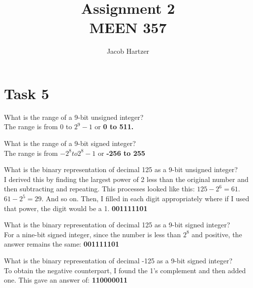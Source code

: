 \documentclass[12pt]{article}
\newenvironment{problem}[2][Problem]{\begin{trivlist}
\item[\hskip \labelsep {\bfseries #1}\hskip \labelsep {\bfseries #2.}]}{\end{trivlist}}
\begin{document}
 
 
\title{Assignment 2\\ MEEN 357}
\author{Jacob Hartzer}
\maketitle
 
\section*{Task 5}
\begin{problem}{i}
What is the range of a 9-bit unsigned integer?\\

The range is from 0 to $2^9-1$ or \bf{0 to 511}.
\end{problem}

\begin{problem}{ii}
What is the range of a 9-bit signed integer? \\

The range is from $-2^8 to 2^8-1$ or \bf{-256 to 255}
\end{problem}

\begin{problem}{iii}
What is the binary representation of decimal 125 as a 9-bit unsigned integer? \\

I derived this by finding the largest power of 2 less than the original number and then subtracting and repeating. This processes looked like this: $125 - 2^6 = 61$. $61 - 2^5 = 29$. And so on. Then, I filled in each digit appropriately where if I used that power, the digit would be a 1.  \bf{001111101} 
\end{problem}

\begin{problem}{iv}
What is the binary representation of decimal 125 as a 9-bit signed integer?\\

For a nine-bit signed integer, since the number is less than $2^8$ and positive, the answer remains the same: \bf{001111101}
\end{problem}

\begin{problem}{v}
What is the binary representation of decimal -125 as a 9-bit signed integer?\\

To obtain the negative counterpart, I found the 1’s complement and then added one. This gave an answer of: \bf{110000011}
\end{problem}
\end{document}
